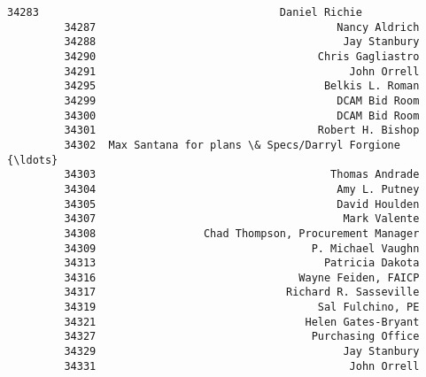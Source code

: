 \documentclass[11pt]{article}
\begin{document}
\begin{Verbatim}[commandchars=\\\{\}]
         34283                                      Daniel Richie   
         34287                                      Nancy Aldrich   
         34288                                       Jay Stanbury   
         34290                                   Chris Gagliastro   
         34291                                        John Orrell   
         34295                                    Belkis L. Roman   
         34299                                      DCAM Bid Room   
         34300                                      DCAM Bid Room   
         34301                                   Robert H. Bishop   
         34302  Max Santana for plans \& Specs/Darryl Forgione {\ldots}   
         34303                                     Thomas Andrade   
         34304                                      Amy L. Putney   
         34305                                      David Houlden   
         34307                                       Mark Valente   
         34308                 Chad Thompson, Procurement Manager   
         34309                                  P. Michael Vaughn   
         34313                                    Patricia Dakota   
         34316                                Wayne Feiden, FAICP   
         34317                              Richard R. Sasseville   
         34319                                   Sal Fulchino, PE   
         34321                                 Helen Gates-Bryant   
         34327                                  Purchasing Office   
         34329                                       Jay Stanbury   
         34331                                        John Orrell   
         

\end{Verbatim}
\end{document}
